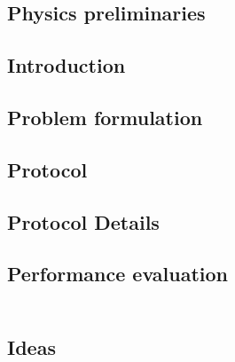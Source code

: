 \documentclass[../../note.tex]{subfiles}
\begin{document}
\subsection{Physics preliminaries}


\subsection{Introduction}


\subsection{Problem formulation}


\subsection{Protocol}


\subsection{Protocol Details}


\subsection{Performance evaluation}

\begin{lemma}
    \begin{align}
    \end{align}
\end{lemma}

\subsection{Ideas}


%
%
\end{document}

